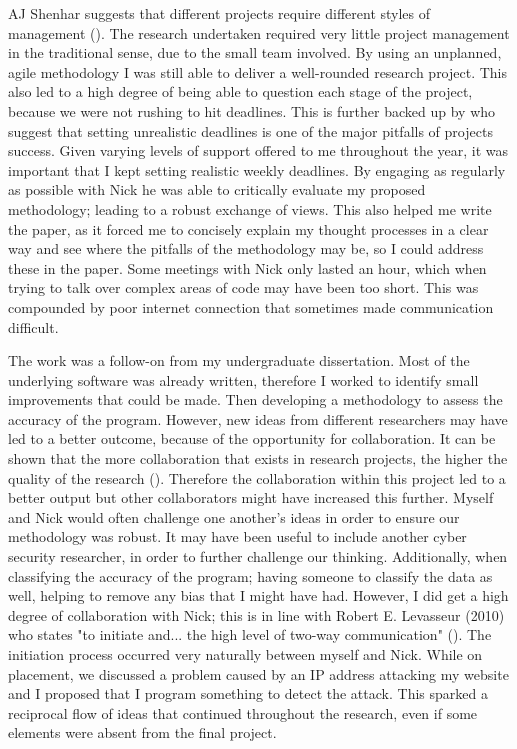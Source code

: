 AJ Shenhar suggests that different projects require different styles of management (\cite{Shenhar1}). The research undertaken required very little project management in the traditional sense, due to the small team involved. By using an unplanned, agile methodology I was still able to deliver a well-rounded research project. This also led to a high degree of being able to question each stage of the project, because we were not rushing to hit deadlines. This is further backed up by \citeauthor{GanttPRO} who suggest that setting unrealistic deadlines is one of the  major pitfalls of projects success. Given varying levels of support offered to me throughout the year, it was important that I kept setting realistic weekly deadlines. By engaging as regularly as possible with Nick he was able to critically evaluate my proposed methodology; leading to a robust exchange of views. This also helped me write the paper, as it forced me to concisely explain my thought processes in a clear way and see where the pitfalls of the methodology may be, so I could address these in the paper. Some meetings with Nick only lasted an hour, which when trying to talk over complex areas of code may have been too short. This was compounded by poor internet connection that sometimes made communication difficult.



The work was a follow-on from my undergraduate dissertation. Most of the underlying software was already written, therefore I worked to identify small improvements that could be made. Then developing a methodology to assess the accuracy of the program. However, new ideas from different researchers may have led to a better outcome, because of the opportunity for collaboration. It can be shown that the more collaboration that exists in research projects, the higher the quality of the research (\cite{figg2006scientific}). Therefore the collaboration within this project led to a better output but other collaborators might have increased this further. Myself and Nick would often challenge one another's ideas in order to ensure our methodology was robust. It may have been useful to include another cyber security researcher, in order to further challenge our thinking. Additionally, when classifying the accuracy of the program; having someone to classify the data as well, helping to remove any bias that I might have had. However, I did get a high degree of collaboration with Nick; this is in line with Robert E. Levasseur (2010) who states "to initiate and... the high level of two-way communication" (\cite{levasseur2010people}). The initiation process occurred very naturally between myself and Nick. While on placement, we discussed a problem caused by an IP address attacking my website and I proposed that I program something to detect the attack. This sparked a reciprocal flow of ideas that continued throughout the research, even if some elements were absent from the final project. 

